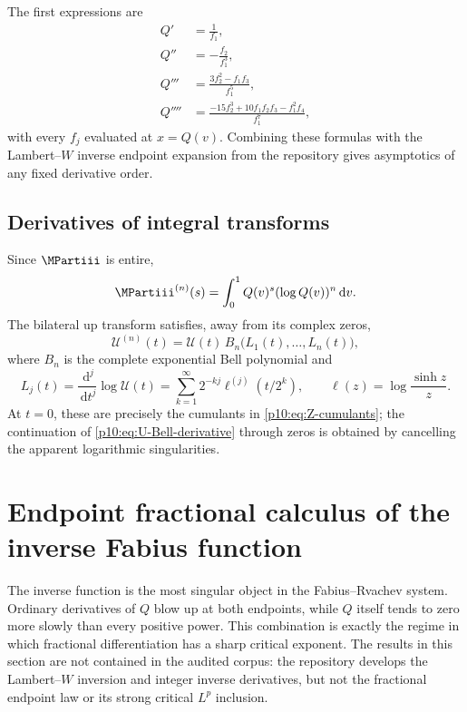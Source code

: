 \documentclass[11pt,oneside]{article}
\theoremstyle{definition}
\theoremstyle{remark}
\newcommand{\Q}{Q}
\newcommand{\dd}{\,\mathrm d}
\newcommand{\1}{\mathbf 1}
\begin{document}
The first expressions are
\begin{align}
 \Q'&=\frac1{f_1},\nonumber\\
 \Q''&=-\frac{f_2}{f_1^3},\nonumber\\
 \Q'''&=\frac{3f_2^2-f_1f_3}{f_1^5},\nonumber\\
 \Q''''&=\frac{-15f_2^3+10f_1f_2f_3-f_1^2f_4}{f_1^7},
 \label{p10:eq:Q-first-derivatives}
\end{align}
with every \(f_j\) evaluated at \(x=\Q(v)\).  Combining these formulas with the
Lambert--\(W\) inverse endpoint expansion from the repository gives asymptotics of any
fixed derivative order.

\subsection{Derivatives of integral transforms}

Since \(\MPartiii\) is entire,
\begin{equation}\label{p10:eq:M-nth-derivative}
 \MPartiii^{(n)}(s)=\int_0^1\Q(v)^s(\log\Q(v))^n\dd v.
\end{equation}
The bilateral up transform satisfies, away from its complex zeros,
\begin{equation}\label{p10:eq:U-Bell-derivative}
 \mathcal U^{(n)}(t)
 =\mathcal U(t)\,
 B_n\bigl(L_1(t),\ldots,L_n(t)\bigr),
\end{equation}
where \(B_n\) is the complete exponential Bell polynomial and
\begin{equation}\label{p10:eq:Lj-def}
 L_j(t)=\frac{\dd^j}{\dd t^j}\log\mathcal U(t)
 =\sum_{k=1}^{\infty}2^{-kj}
 \ell^{(j)}(t/2^k),
 \qquad \ell(z)=\log\frac{\sinh z}{z}.
\end{equation}
At \(t=0\), these are precisely the cumulants in \cref{p10:eq:Z-cumulants}; the
continuation of \cref{p10:eq:U-Bell-derivative} through zeros is obtained by cancelling the
apparent logarithmic singularities.

\section{Endpoint fractional calculus of the inverse Fabius function}
\label{p10:sec:inverse-fractional-endpoint}

The inverse function is the most singular object in the Fabius--Rvachev system.
Ordinary derivatives of \(\Q\) blow up at both endpoints, while \(\Q\) itself tends to
zero more slowly than every positive power.  This combination is exactly the regime in
which fractional differentiation has a sharp critical exponent.  The results in this
section are not contained in the audited corpus: the repository develops the
Lambert--\(W\) inversion and integer inverse derivatives, but not the fractional
endpoint law or its strong critical \(L^p\) inclusion.
\end{document}
